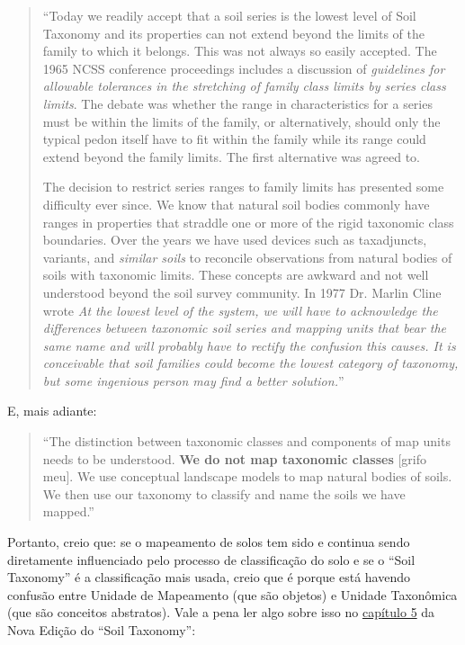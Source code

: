 \begin{quotation}
  ``Today we readily accept that a soil series is the lowest level of Soil Taxonomy and its properties can not extend beyond the limits of the family to which it belongs. This was not always so easily accepted. The 1965 NCSS conference proceedings includes a discussion of \textit{guidelines for allowable tolerances in the stretching of family class limits by series class limits}. The debate was whether the range in characteristics for a series must be within the limits of the family, or alternatively, should only the typical pedon itself have to fit within the family while its range could extend beyond the family limits. The first alternative was agreed to.
    
  The decision to restrict series ranges to family limits has presented some difficulty ever since. We know that natural soil bodies commonly have ranges in properties that straddle one or more of the rigid taxonomic class boundaries. Over the years we have used devices such as taxadjuncts, variants, and \textit{similar soils} to reconcile observations from natural bodies of soils with taxonomic limits. These concepts are awkward and not well understood beyond the soil survey community. In 1977 Dr. Marlin Cline wrote \textit{At the lowest level of the system, we will have to acknowledge the differences between taxonomic soil series and mapping units that bear the same name and will probably have to rectify the confusion this causes. It is conceivable that soil families could become the lowest category of taxonomy, but some ingenious person may find a better solution.}''
\end{quotation}

E, mais adiante:

\begin{quotation}
  ``The distinction between taxonomic classes and components of map units needs to be understood. \textbf{We do not map taxonomic classes} [grifo meu]. We use conceptual landscape models to map natural bodies of soils. We then use our taxonomy to classify and name the soils we have mapped.''   
\end{quotation}

Portanto, creio que: se o mapeamento de solos tem sido e continua sendo diretamente influenciado pelo processo de classificação do solo e se o ``Soil Taxonomy'' é a classificação mais usada, creio que é porque está havendo confusão entre Unidade de Mapeamento (que são objetos) e Unidade Taxonômica (que são conceitos abstratos). Vale a pena ler algo sobre isso no \href{http://casoilresource.lawr.ucdavis.edu/w/images/d/d8/CHAPTER_5_Application_of_Soil_Taxonomy_to_Soil_Surveys.pdf}{capítulo 5} da Nova Edição do ``Soil Taxonomy'':

